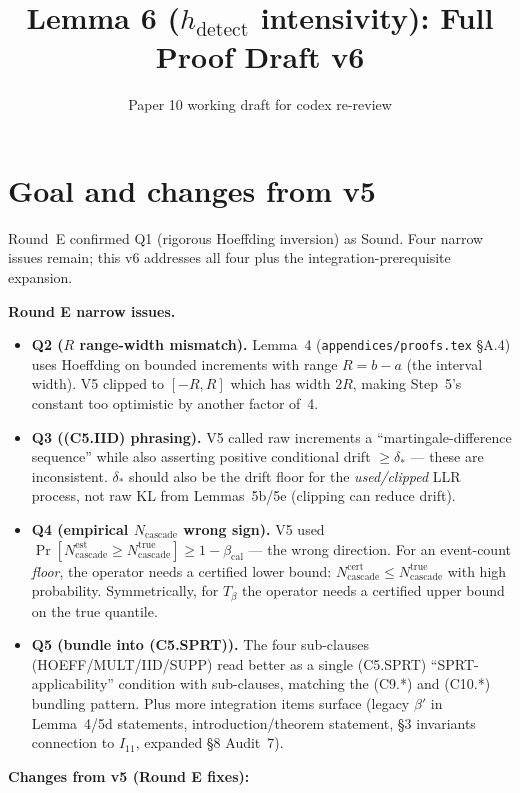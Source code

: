 \documentclass{article}
\title{Lemma 6 ($h_{\mathrm{detect}}$ intensivity): Full Proof Draft v6}
\author{Paper 10 working draft for codex re-review}
\date{}
\newcommand{\deltastar}{\delta_{*}}
\newcommand{\Tbeta}{T_{\beta}}
\newcommand{\Ncasc}{N_{\mathrm{cascade}}}
\newcommand{\bcal}{\beta_{\mathrm{cal}}}
\begin{document}
\maketitle

\section{Goal and changes from v5}

Round~E confirmed Q1 (rigorous Hoeffding inversion) as Sound.  Four
narrow issues remain; this v6 addresses all four plus the
integration-prerequisite expansion.

\textbf{Round E narrow issues.}
\begin{itemize}
\item \textbf{Q2 ($R$ range-width mismatch).}  Lemma~4
  (\texttt{appendices/proofs.tex} §A.4) uses Hoeffding on bounded
  increments with range $R = b - a$ (the interval width).  V5
  clipped to $[-R, R]$ which has width $2R$, making Step~5's
  constant too optimistic by another factor of~4.
\item \textbf{Q3 ((C5.IID) phrasing).}  V5 called raw increments a
  ``martingale-difference sequence'' while also asserting positive
  conditional drift $\geq \deltastar$ — these are inconsistent.
  $\deltastar$ should also be the drift floor for the
  \emph{used/clipped} LLR process, not raw KL from Lemmas~5b/5e
  (clipping can reduce drift).
\item \textbf{Q4 (empirical $\Ncasc$ wrong sign).}  V5 used
  $\Pr[\Ncasc^{\mathrm{est}} \geq \Ncasc^{\mathrm{true}}] \geq 1 -
  \bcal$ — the wrong direction.  For an event-count \emph{floor},
  the operator needs a certified lower bound:
  $\Ncasc^{\mathrm{cert}} \leq \Ncasc^{\mathrm{true}}$ with high
  probability.  Symmetrically, for $\Tbeta$ the operator needs a
  certified upper bound on the true quantile.
\item \textbf{Q5 (bundle into (C5.SPRT)).}  The four sub-clauses
  (HOEFF/MULT/IID/SUPP) read better as a single (C5.SPRT)
  ``SPRT-applicability'' condition with sub-clauses, matching the
  (C9.*) and (C10.*) bundling pattern.  Plus more integration items
  surface (legacy $\beta'$ in Lemma~4/5d statements,
  introduction/theorem statement, §3 invariants connection to
  $I_{11}$, expanded §8 Audit~7).
\end{itemize}

\textbf{Changes from v5 (Round E fixes):}
\end{document}

